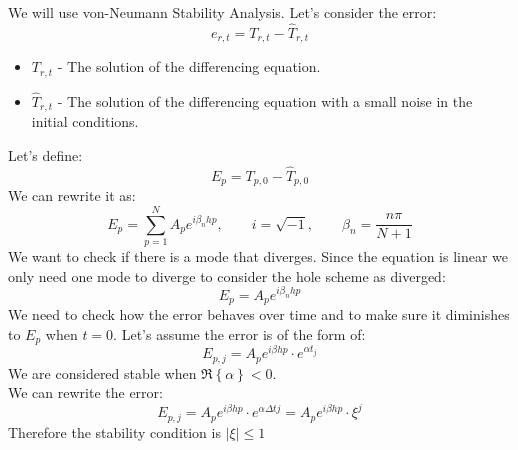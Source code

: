 \documentclass[11pt, a4paper]{article}
\begin{document}
\noindent We will use von-Neumann Stability Analysis. Let's consider the error:
\begin{equation}
    e_{r,t}=T_{r,t}-\hat{T}_{r,t}
\end{equation}
\begin{itemize}
    \item $T_{r,t}$ - The solution of the differencing equation.
    \item $\hat{T}_{r,t}$ - The solution of the differencing equation with a small noise in the initial conditions.
\end{itemize}
\noindent Let's define:
\begin{equation}
    E_p=T_{p,0}-\hat{T}_{p,0}
\end{equation}
We can rewrite it as:
\begin{equation}
    E_p=\sum_{p=1}^{N}A_pe^{i\beta_n h p},\qquad i=\sqrt{-1},\qquad\beta_n=\frac{n\pi}{N+1}
\end{equation}
We want to check if there is a mode that diverges. Since the equation is linear we only need one mode to diverge to consider the hole scheme as diverged:
\begin{equation}
    E_p=A_pe^{i\beta_n h p}
\end{equation}
We need to check how the error behaves over time and to make sure it diminishes to $E_p$ when $t=0$.
Let's assume the error is of the form of:
\begin{equation}
    E_{p,j}=A_pe^{i\beta h p}\cdot e^{\alpha t_j}
\end{equation}
We are considered stable when $\Re{\left\{\alpha\right\}}<0$. \\
We can rewrite the error:
\begin{equation}
    E_{p,j}=A_pe^{i\beta h p}\cdot e^{\alpha\Delta tj}=A_pe^{i\beta h p}\cdot\xi^j
\end{equation}
Therefore the stability condition is $\left|\xi\right|\le1$ \\
\end{document}
